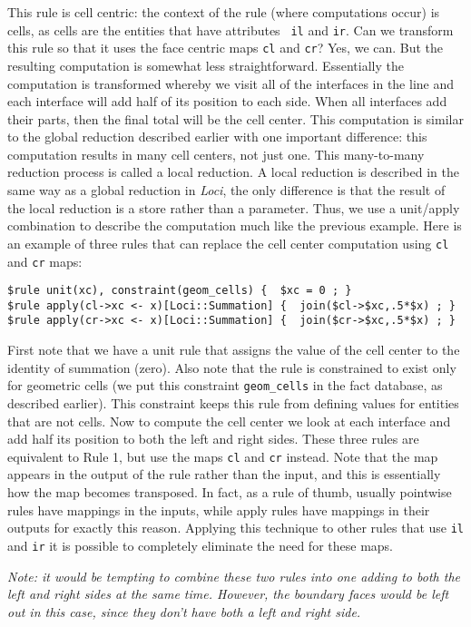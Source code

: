 \documentclass[10pt,epsf]{book}
\begin{document}
This rule is cell centric: the context of the rule (where computations
occur) is cells, as cells are the entities that have attributes {\tt
  il} and {\tt ir}.  Can we transform this rule so that it uses the
face centric maps {\tt cl} and {\tt cr}?  Yes, we can.  But the
resulting computation is somewhat less straightforward.  Essentially
the computation is transformed whereby we visit all of the interfaces
in the line and each interface will add half of its position to each
side.  When all interfaces add their parts, then the final total will
be the cell center.  This computation is similar to the global
reduction described earlier with one important difference: this
computation results in many cell centers, not just one.  This
many-to-many reduction process is called a local reduction.  A local
reduction is described in the same way as a global reduction in {\it Loci},
the only difference is that the result of the local reduction is a
store rather than a parameter.  Thus, we use a unit/apply combination
to describe the computation much like the previous example.  Here is
an example of three rules that can replace the cell center computation
using {\tt cl} and {\tt cr} maps:
\begin{verbatim}
$rule unit(xc), constraint(geom_cells) {  $xc = 0 ; }
$rule apply(cl->xc <- x)[Loci::Summation] {  join($cl->$xc,.5*$x) ; }
$rule apply(cr->xc <- x)[Loci::Summation] {  join($cr->$xc,.5*$x) ; }
\end{verbatim}
First note that we have a unit rule that assigns the value of the cell
center to the identity of summation (zero).  Also note that the rule
is constrained to exist only for geometric cells (we put this
constraint {\tt geom\_cells} in the fact database, as described
earlier).  This constraint keeps this rule from defining values for
entities that are not cells.  Now to compute the cell center we look
at each interface and add half its position to both the left and right
sides.  These three rules are equivalent to Rule 1, but use the maps
{\tt cl} and {\tt cr} instead.  Note that the map appears in the
output of the rule rather than the input, and this is essentially how
the map becomes transposed.  In fact, as a rule of thumb, usually
pointwise rules have mappings in the inputs, while apply rules have
mappings in their outputs for exactly this reason.  Applying this
technique to other rules that use {\tt il} and {\tt ir} it is possible
to completely eliminate the need for these maps.

{\it Note: it would be tempting to combine these two rules
into one adding to both the left and right sides at the same time.
However, the boundary faces would be left out in this case, since they
don't have both a left and right side.}
\end{document}
